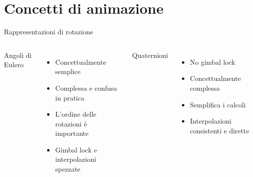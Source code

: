\documentclass[10pt]{beamer}
\begin{document}
\section{Concetti di animazione}										%
\begin{frame}{Rappresentazioni di rotazione}				%
  \begin{columns}[T,onlytextwidth]									%
    Angoli di Eulero
      \begin{itemize}[<+- | alert@+>]
							\item Concettualmente semplice							%
        \item Complessa e confusa in pratica							%
        \item L'ordine delle rotazioni è importante				%
        \item Gimbal lock e interpolazioni spezzate				%
      \end{itemize}										%

		Quaternioni
      \begin{itemize}[<+- | alert@+>]
        \item No gimbal lock												%
				\item Concettualmente complessa							%
        \item Semplifica i calcoli									%
        \item Interpolazioni consistenti e dirette  %
      \end{itemize}
      

\end{columns}
\end{frame}
\end{document}
